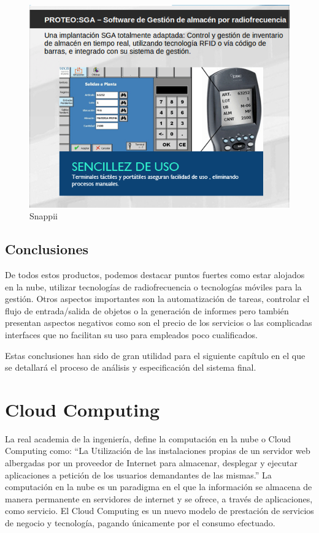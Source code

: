 \documentclass[a4paper,11pt]{book}
\begin{document}
\begin{figure}[H]  
\centering 
\includegraphics[scale=0.5]{imagenes/estudioArte/proteo_sga.png}
\caption{Snappii}  
\end{figure}




\subsection{Conclusiones}

De todos estos productos, podemos destacar puntos fuertes como estar alojados en la nube, utilizar tecnologías de radiofrecuencia o tecnologías móviles para la gestión. Otros aspectos importantes son la automatización de tareas, controlar el flujo de entrada/salida de objetos o la generación de informes pero también presentan aspectos negativos como son el precio de los servicios o las complicadas interfaces que no facilitan su uso para empleados poco cualificados. 

Estas conclusiones  han sido de gran utilidad para el siguiente capítulo en el que se detallará el proceso de análisis y especificación del sistema final.  


\section{Cloud Computing}
La real academia de la ingeniería, define la computación en la nube o Cloud Computing  como: “La Utilización de las instalaciones propias de un servidor web albergadas por un proveedor de Internet para almacenar, desplegar y ejecutar aplicaciones a petición de los usuarios demandantes de las mismas.”\cite{RAI} La computación en la nube es un paradigma en el que la información se almacena de manera permanente en servidores de internet y se ofrece, a través de aplicaciones, como servicio. El Cloud Computing es un nuevo modelo de prestación de servicios\cite{magazine} de negocio y tecnología, pagando únicamente por el consumo efectuado.
\end{document}

